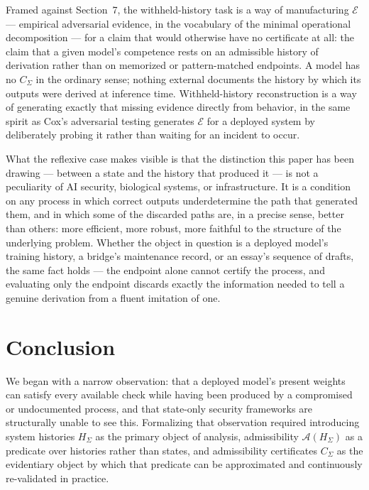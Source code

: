 \documentclass[11pt]{article}
\begin{document}
Framed against Section~7, the withheld-history task is a way of manufacturing $\mathcal{E}$ --- empirical adversarial evidence, in the vocabulary of the minimal operational decomposition --- for a claim that would otherwise have no certificate at all: the claim that a given model's competence rests on an admissible history of derivation rather than on memorized or pattern-matched endpoints. A model has no $C_\Sigma$ in the ordinary sense; nothing external documents the history by which its outputs were derived at inference time. Withheld-history reconstruction is a way of generating exactly that missing evidence directly from behavior, in the same spirit as Cox's adversarial testing generates $\mathcal{E}$ for a deployed system by deliberately probing it rather than waiting for an incident to occur.

What the reflexive case makes visible is that the distinction this paper has been drawing --- between a state and the history that produced it --- is not a peculiarity of AI security, biological systems, or infrastructure. It is a condition on any process in which correct outputs underdetermine the path that generated them, and in which some of the discarded paths are, in a precise sense, better than others: more efficient, more robust, more faithful to the structure of the underlying problem. Whether the object in question is a deployed model's training history, a bridge's maintenance record, or an essay's sequence of drafts, the same fact holds --- the endpoint alone cannot certify the process, and evaluating only the endpoint discards exactly the information needed to tell a genuine derivation from a fluent imitation of one.

\section{Conclusion}

We began with a narrow observation: that a deployed model's present weights can satisfy every available check while having been produced by a compromised or undocumented process, and that state-only security frameworks are structurally unable to see this. Formalizing that observation required introducing system histories $H_\Sigma$ as the primary object of analysis, admissibility $\mathcal{A}(H_\Sigma)$ as a predicate over histories rather than states, and admissibility certificates $C_\Sigma$ as the evidentiary object by which that predicate can be approximated and continuously re-validated in practice.
\end{document}
